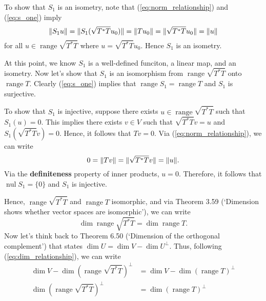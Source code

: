 \documentclass{article}
\begin{document}
To show that $S_1$ is an isometry, note that (\ref{eq:norm_relationship}) and (\ref{eq:s_one}) imply
\begin{equation}\label{eq:norm_relation_s_one}
\lVert S_1 u\rVert=\lVert S_1(\sqrt{T^*T}u_0)\rVert=\lVert Tu_0\rVert=\lVert\sqrt{T^*T}u_0\rVert=\lVert u\rVert
\end{equation}
for all $u\in\operatorname{range}\sqrt{T^*T}$ where $u=\sqrt{T^*T}u_0$. Hence $S_1$ is an isometry.

At this point, we know $S_1$ is a well-defined funciton, a linear map, and an isometry. Now let's show that $S_1$ is an isomorphism from $\operatorname{range}\sqrt{T^*T}$ onto $\operatorname{range}T$. Clearly (\ref{eq:s_one}) implies that $\operatorname{range}S_1=\operatorname{range}T$ and $S_1$ is surjective. 

To show that $S_1$ is injective, suppose there exists $u\in \operatorname{range}\sqrt{T^*T}$ such that $S_1(u)=0$. This implies there exists $v\in V$ such that $\sqrt{T^*T}v=u$ and $S_1(\sqrt{T^*T}v)=0$. Hence, it follows that $Tv=0$. Via (\ref{eq:norm_relationship}), we can write
\[0=\lVert Tv\rVert=\lVert\sqrt{T^*T}v\rVert=\lVert u\rVert.\]
Via the \textbf{definiteness} property of inner products, $u=0$. Therefore, it follows that $\operatorname{nul}S_1=\{0\}$ and $S_1$ is injective.

Hence, $\operatorname{range}\sqrt{T^*T}$ and $\operatorname{range}T$ isomorphic, and via Theorem 3.59 (`Dimension shows whether vector spaces are isomorphic'), we can write
\begin{equation}\label{eq:dim_relationship}
    \operatorname{dim}\operatorname{range}\sqrt{T^*T}=\operatorname{dim}\operatorname{range}T.
\end{equation}
Now let's think back to Theorem 6.50 (`Dimension of the orthogonal complement') that states $\operatorname{dim}U=\operatorname{dim}V-\operatorname{dim}U^\bot$. Thus, following (\ref{eq:dim_relationship}), we can write
\begin{align*}
    \operatorname{dim}V-\operatorname{dim}(\operatorname{range}\sqrt{T^*T})^\bot&=\operatorname{dim}V-\operatorname{dim}(\operatorname{range}T)^\bot\\
    \operatorname{dim}(\operatorname{range}\sqrt{T^*T})^\bot&=\operatorname{dim}(\operatorname{range}T)^\bot
\end{align*}
\end{document}
